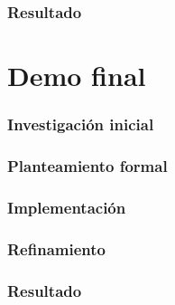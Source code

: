 \subsection{Resultado}

\chapter{Demo final}

\subsection{Investigación inicial}
\subsection{Planteamiento formal}
\subsection{Implementación}
\subsection{Refinamiento}
\subsection{Resultado}
